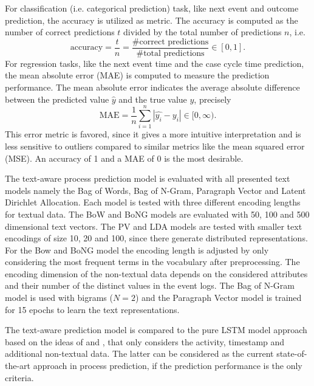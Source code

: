 For classification (i.e. categorical prediction) task, like next event and outcome prediction, the accuracy is utilized as metric.
The accuracy is computed as the number of correct predictions $t$ divided by the total number of predictions $n$, i.e. 
\begin{equation*}
	\textrm{accuracy} = \dfrac{t}{n} = \dfrac{\textrm{\# correct predictions}}{\textrm{\# total predictions}} \in [0,1].
\end{equation*}
For regression tasks, like the next event time and the case cycle time prediction, the mean absolute error (MAE) is computed to measure the prediction performance. The mean absolute error indicates the average absolute difference between the predicted value $\hat{y}$ and the true value $y$,  precisely
\begin{equation*}
	\textrm{MAE} = \dfrac{1}{n}\sum_{i=1}^{n}|\hat{y_i} - y_i| \in [0, \infty).
\end{equation*}
This error metric is favored, since it gives a more intuitive interpretation and is less sensitive to outliers compared to similar metrics like the mean squared error (MSE).
An accuracy of 1 and a MAE of 0 is the most desirable.

The text-aware process prediction model is evaluated with all presented text models namely the Bag of Words, Bag of N-Gram, Paragraph Vector and Latent Dirichlet Allocation.
Each model is tested with three different encoding lengths for textual data.
The BoW and BoNG models are evaluated with 50, 100 and 500 dimensional text vectors. The PV and LDA models are tested with smaller text encodings of size 10, 20 and 100, since there generate distributed representations.
For the Bow and BoNG model the encoding length is adjusted by only considering the most frequent terms in the vocabulary after preprocessing.
The encoding dimension of the non-textual data depends on the considered attributes and their number of the distinct values in the event logs.
The Bag of N-Gram model is used with bigrams ($N = 2$) and the Paragraph Vector model is trained for 15 epochs to learn the text representations.

The text-aware prediction model is compared to the pure LSTM model approach based on the ideas of \citeauthor{DBLP:conf/caise/TaxVRD17} \cite{DBLP:conf/caise/TaxVRD17} and \citeauthor{DBLP:conf/ssci/NavarinVPS17} \cite{DBLP:conf/ssci/NavarinVPS17}, that only considers the activity, timestamp and additional non-textual data.
The latter can be considered as the current state-of-the-art approach in process prediction, if the prediction performance is the only criteria.


